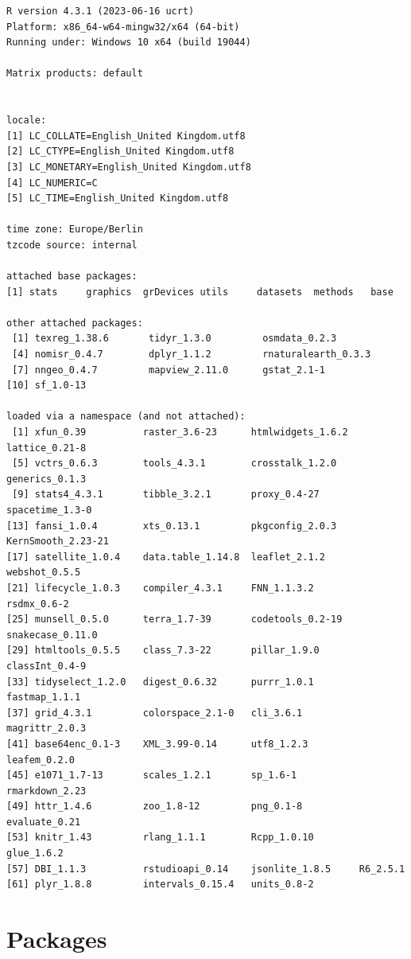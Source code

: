 \documentclass[
  letterpaper,
  DIV=11,
  numbers=noendperiod]{scrreprt}
\begin{document}
\begin{verbatim}
R version 4.3.1 (2023-06-16 ucrt)
Platform: x86_64-w64-mingw32/x64 (64-bit)
Running under: Windows 10 x64 (build 19044)

Matrix products: default


locale:
[1] LC_COLLATE=English_United Kingdom.utf8 
[2] LC_CTYPE=English_United Kingdom.utf8   
[3] LC_MONETARY=English_United Kingdom.utf8
[4] LC_NUMERIC=C                           
[5] LC_TIME=English_United Kingdom.utf8    

time zone: Europe/Berlin
tzcode source: internal

attached base packages:
[1] stats     graphics  grDevices utils     datasets  methods   base     

other attached packages:
 [1] texreg_1.38.6       tidyr_1.3.0         osmdata_0.2.3      
 [4] nomisr_0.4.7        dplyr_1.1.2         rnaturalearth_0.3.3
 [7] nngeo_0.4.7         mapview_2.11.0      gstat_2.1-1        
[10] sf_1.0-13          

loaded via a namespace (and not attached):
 [1] xfun_0.39          raster_3.6-23      htmlwidgets_1.6.2  lattice_0.21-8    
 [5] vctrs_0.6.3        tools_4.3.1        crosstalk_1.2.0    generics_0.1.3    
 [9] stats4_4.3.1       tibble_3.2.1       proxy_0.4-27       spacetime_1.3-0   
[13] fansi_1.0.4        xts_0.13.1         pkgconfig_2.0.3    KernSmooth_2.23-21
[17] satellite_1.0.4    data.table_1.14.8  leaflet_2.1.2      webshot_0.5.5     
[21] lifecycle_1.0.3    compiler_4.3.1     FNN_1.1.3.2        rsdmx_0.6-2       
[25] munsell_0.5.0      terra_1.7-39       codetools_0.2-19   snakecase_0.11.0  
[29] htmltools_0.5.5    class_7.3-22       pillar_1.9.0       classInt_0.4-9    
[33] tidyselect_1.2.0   digest_0.6.32      purrr_1.0.1        fastmap_1.1.1     
[37] grid_4.3.1         colorspace_2.1-0   cli_3.6.1          magrittr_2.0.3    
[41] base64enc_0.1-3    XML_3.99-0.14      utf8_1.2.3         leafem_0.2.0      
[45] e1071_1.7-13       scales_1.2.1       sp_1.6-1           rmarkdown_2.23    
[49] httr_1.4.6         zoo_1.8-12         png_0.1-8          evaluate_0.21     
[53] knitr_1.43         rlang_1.1.1        Rcpp_1.0.10        glue_1.6.2        
[57] DBI_1.1.3          rstudioapi_0.14    jsonlite_1.8.5     R6_2.5.1          
[61] plyr_1.8.8         intervals_0.15.4   units_0.8-2       
\end{verbatim}

\hypertarget{packages}{%
\section{Packages}\label{packages}}
\end{document}
